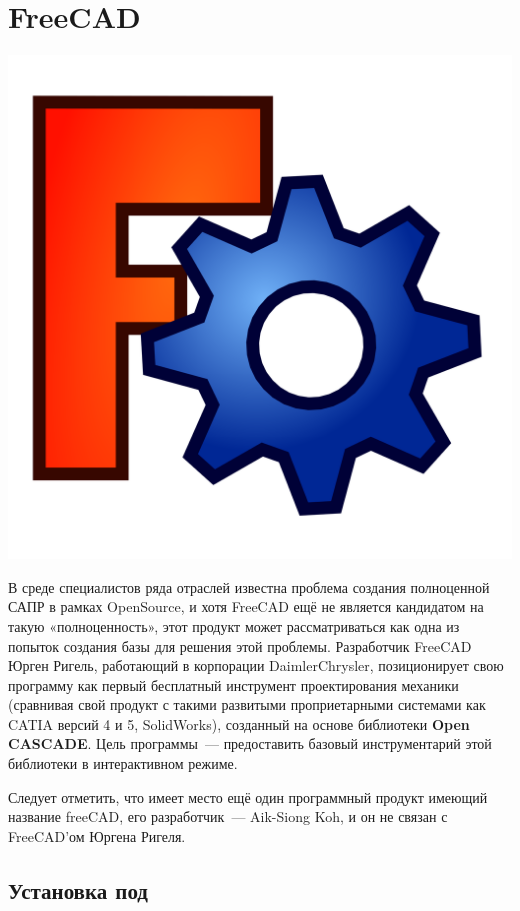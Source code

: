 \chapter{FreeCAD}

\includegraphics[height=0.5\textheight]{logo/FreeCAD.png}


В среде специалистов ряда отраслей известна проблема создания полноценной САПР в
рамках OpenSource, и хотя FreeCAD ещё не является кандидатом на такую
«полноценность», этот продукт может рассматриваться как одна из попыток создания
базы для решения этой проблемы. Разработчик FreeCAD Юрген Ригель, работающий в
корпорации DaimlerChrysler, позиционирует свою программу как первый бесплатный
инструмент проектирования механики (сравнивая свой продукт с такими развитыми
проприетарными системами как CATIA версий 4 и 5, SolidWorks), созданный на
основе библиотеки \textbf{Open CASCADE}. Цель программы\ --- предоставить
базовый инструментарий этой библиотеки в интерактивном режиме.

Следует отметить, что имеет место ещё один программный продукт имеющий название
freeCAD, его разработчик\ --- Aik-Siong Koh, и он не связан с FreeCAD’ом Юргена
Ригеля.

\section{Установка под \win}

